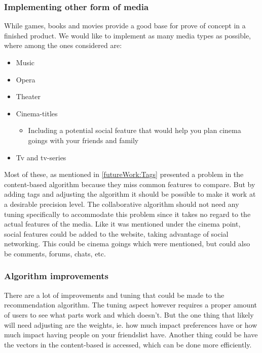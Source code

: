 \subsubsection{Implementing other form of media}
While games, books and movies provide a good base for prove of concept in a finished product. We would like to implement as many media types as possible, where among the ones considered are:
\begin{itemize}
\item Music
\item Opera
\item Theater
\item Cinema-titles
\begin{itemize}
\item Including a potential social feature that would help you plan cinema goings with your friends and family
\end{itemize}
\item Tv and tv-series
\end{itemize}
Most of these, as mentioned in \ref{futureWork:Tags} presented a problem in the content-based algorithm because they miss common features to compare. But by adding tags and adjusting the algorithm it should be possible to make it work at a desirable precision level. The collaborative algorithm should not need any tuning specifically to accommodate this problem since it takes no regard to the actual features of the media. Like it was mentioned under the cinema point, social features could be added to the website, taking advantage of social networking. This could be cinema goings which were mentioned, but could also be comments, forums, chats, etc.

\subsubsection{Algorithm improvements}
There are a lot of improvements and tuning that could be made to the recommendation algorithm. The tuning aspect however requires a proper amount of users to see what parts work and which doesn’t. But the one thing that likely will need adjusting are the weights, ie. how much impact preferences have or how much impact having people on your friendslist have. Another thing could be have the vectors in the content-based is accessed, which can be done more efficiently.

